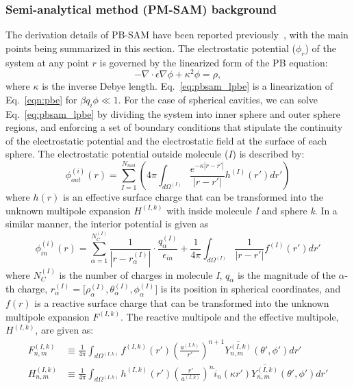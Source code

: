 \documentclass[12pt,titlepage]{article}
\begin{document}
\subsubsection{Semi-analytical method (PM-SAM) background}
The derivation details of PB-SAM have been reported  previously~\cite{Yap2010, Yap2013}, with the main points being summarized in this section.
The electrostatic potential ($\phi_r$) of the system at any point $r$ is governed by the linearized form of the PB equation:
%
\begin{equation}
	-\nabla \cdot \epsilon \nabla \phi + \kappa^2 \phi = \rho,
	\label{eq:pbsam_lpbe}
\end{equation}
%
where $\kappa$ is the inverse Debye length.
Eq.~\ref{eq:pbsam_lpbe} is a linearization of Eq.~\ref{eqn:pbe} for $\beta q_i \phi \ll 1$.
For the case of spherical cavities, we can solve Eq.~\ref{eq:pbsam_lpbe} by dividing the system into inner sphere and outer sphere regions, and enforcing a set of boundary conditions that stipulate the continuity of the electrostatic potential and the electrostatic field at the surface of each sphere.
The electrostatic potential outside molecule ($I$) is described by:
%
\begin{equation}
	\phi_{out}^{(i)} ({r})  = \sum_{I=1}^{N_{mol}} \left( 4 \pi \int_{d\Omega^{(I)}} \frac{e^{-\kappa | r - r'|}}{|r - r'|} h^{(I)} (r') dr'  \right)
	\label{eq:pbsam_phi_in}
\end{equation}
%
where \(h(r)\) is an effective surface charge that can be transformed into the unknown multipole expansion \(H^{(I,k)}\) with inside molecule \textit{I} and sphere \textit{k}.
In a similar manner, the interior potential is given as
%
\begin{equation}
	\phi_{in}^{(i)} ({r})  = \sum_{\alpha = 1}^{N_C^{(I)}} \frac{1}{|r-r_{\alpha}^{(I)}|} \cdot \frac{q_\alpha^{(I)}} {\epsilon_{in}} + \frac{1}{4\pi} \int_{d\Omega^{(I)}} \frac{1}{|r - r'|} f^{(I)} (r') dr' 
	\label{eq:pbsam_phi_out}
\end{equation}
%
where \( N_C^{(I)}\) is the number of charges in molecule \textit{I}, \( q_\alpha\) 
is the magnitude of the \(\alpha\)-th charge, \( r_\alpha^{(I)} = \Big[\rho_{\alpha}^{(I)} , \theta_{\alpha}^{(I)} , \phi_{\alpha}^{(I)} \Big]\) is its position in spherical 
coordinates, and \(f(r)\) is a reactive surface charge that can
be transformed into the unknown multipole expansion \(F^{(I,k)}\).
The reactive multipole and the effective multipole, \(H^{(I,k)}\), are given as:
%
\begin{align}
	F_{n,m}^{(I,k)} &\equiv  \frac{1}{4\pi} \int_{d\Omega^{(I,k)}} f^{(I,k)}(r') \left (  \frac{ a^{(I,k)}}  {r'} \right ) ^{n+1} \overline{ Y^{(I,k)}_{n,m}} (\theta' , \phi') dr'
	\label{eq:fmat} \\
	H_{n,m}^{(I,k)} &\equiv  \frac{1}{4\pi} \int_{d\Omega^{(I,k)}} h^{(I,k)}(r') \left (  \frac{ r'}{a^{(I,k)}} \right ) ^{n} \hat{i}_n(\kappa r') \overline{ Y^{(I,k)}_{n,m}} (\theta' , \phi') dr'
	\label{eq:hmat}
\end{align}
\end{document}
